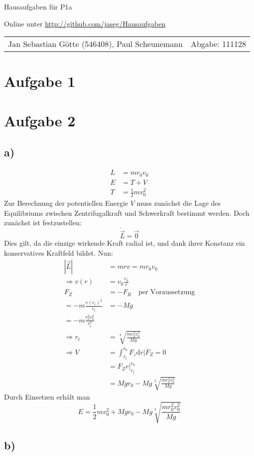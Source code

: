 \documentclass[12pt,a4paper,notitlepage]{article}
\newcommand{\diff}{\mathrm{d}}
\newcommand{\aufgabe}[1]{\section*{\setcounter{section}{#1}Aufgabe #1}}
\begin{document}
\begin{center}
\Large Hausaufgaben für P1a

\normalsize Online unter \url{http://github.com/jaseg/Hausaufgaben}
\end{center}
\begin{tabularx}{\textwidth}{Xr}
Jan Sebastian Götte (546408), Paul Scheunemann&Abgabe: 111128
\end{tabularx}
\aufgabe{1}
\aufgabe{2}
\subsection*{a)}
\begin{align}
L&=mr_0v_0\\
E&=T+V\\
T&=\frac{1}{2}mv_0^2
\end{align}
Zur Berechnung der potentiellen Energie $V$ muss zunächst die Lage des Equilibriums zwischen Zentrifugalkraft und Schwerkraft bestimmt werden. Doch zunächst ist festzustellen:
\begin{equation}
\dot{\vec L}=\vec 0
\end{equation}
Dies gilt, da die einzige wirkende Kraft radial ist, und dank ihrer Konstanz ein konservatives Kraftfeld bildet. Nun:
\begin{align}
\left|\vec L\right|&=mrv=mr_0v_0\\
\Rightarrow v(r)&=v_0\frac{r_0}{r}\\
F_Z&=-F_R\quad\text{per Voraussetzung}\\
=-m\frac{v(r_t)^2}{r_t}&=-Mg\\
=-m\frac{r_0^2v_0^2}{r_t^3}\\
\Rightarrow r_t&=\sqrt[3]{\frac{mr_0^2v_0^2}{Mg}}\\
\Rightarrow V&=\int_{r_t}^{r_0}F_z\diff r\Big|\dot F_Z=0\\
&=F_Zr\Big|_{r_t}^{r_0}\\
&=Mgr_0-Mg\sqrt[3]{\frac{mr_0^2v_0^2}{Mg}}
\end{align}
Durch Einsetzen erhält man
\begin{equation}
E=\frac{1}{2}mv_0^2+Mgr_0-Mg\sqrt[3]{\frac{mr_0^2v_0^2}{Mg}}
\end{equation}
\subsection*{b)}
\end{document}

